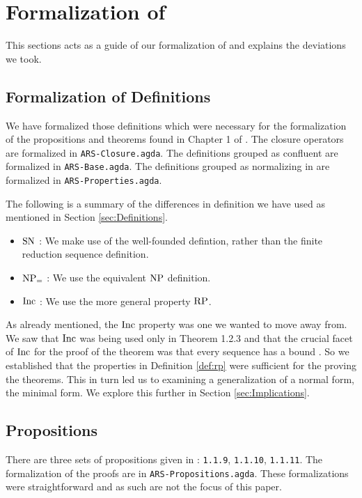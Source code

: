 \section{Formalization of \terese}
\label{sec:Formalization}
This sections acts as a guide of our formalization of \terese and explains the deviations we took.  

\subsection{Formalization of Definitions}\label{subsec:def}
We have formalized those definitions which were necessary for the formalization of the propositions and theorems found 
in Chapter 1 of \terese. 
The closure operators are formalized in \texttt{ARS-Closure.agda}. 
The definitions grouped as confluent \terese are formalized in \texttt{ARS-Base.agda}. 
The definitions grouped as normalizing in \terese are formalized in \texttt{ARS-Properties.agda}.  

The following is a summary of the differences in definition we have used as mentioned in Section \ref{sec:Definitions}. 
\begin{itemize}
    \item $\mathrm{SN}$ : We make use of the well-founded defintion, rather than the finite reduction sequence definition.
    \item $\mathrm{NP_=}$ : We use the equivalent $\mathrm{NP}$ definition. 
    \item $\mathrm{Inc}$ : We use the more general property $\mathrm{RP}$.      
\end{itemize}

As already mentioned, the $\mathrm{Inc}$ property was one we wanted to move away from. We saw that $\mathrm{Inc}$ was being used only in Theorem 1.2.3 
and that the crucial facet of $\mathrm{Inc}$ for the proof of the theorem was that every sequence has a bound . 
So we established that the properties in Definition \ref{def:rp} were sufficient for the proving the theorems. This in turn led us to examining 
a generalization of a normal form, the minimal form. We explore this further in Section \ref{sec:Implications}.

\subsection{Propositions}
There are three sets of propositions given in \terese: \texttt{1.1.9}, \texttt{1.1.10}, \texttt{1.1.11}. 
The formalization of the proofs are in \texttt{ARS-Propositions.agda}. These formalizations were straightforward 
and as such are not the focus of this paper. 

